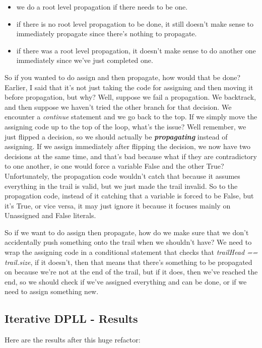 \documentclass[../main.tex]{subfiles}
\begin{document}
\begin{itemize}
    \item we do a root level propagation if there needs to be one.
    \item if there is no root level propagation to be done, it still
            doesn't make sense to immediately propagate since there's 
            nothing to propagate.
    \item if there was a root level propagation, it doesn't make sense 
            to do another one immediately since we've just completed one.
\end{itemize}

So if you wanted to do assign and then propagate, how would that be done? 
Earlier, I said that it's not just taking the code for assigning and then 
moving it before propagation, but why? Well, suppose we fail a propagation. 
We backtrack, and then suppose we haven't tried the other branch for that 
decision. We encounter a \textit{continue} statement and we go back to the 
top. If we simply move the assigning code up to the top of the loop,
what's the issue? Well remember, we just flipped a decision, so we should
actually be \textbf{\textit{propagating}} instead of assigning. If we 
assign immediately after flipping the decision, we now have two decisions 
at the same time, and that's bad because what if they are contradictory to 
one another, ie one would force a variable False and the other True? 
Unfortunately, the propagation code wouldn't catch that because it assumes 
everything in the trail is valid, but we just made the trail invalid. So 
to the propagation code, instead of it catching that a variable is forced to be 
False, but it's True, or vice versa, it may just ignore it because it focuses 
mainly on Unassigned and False literals.

So if we want to do assign then propagate, how do we make sure that 
we don't accidentally push something onto the trail when we shouldn't have?
We need to wrap the assigning code in a conditional statement that checks that 
\textit{trailHead == trail.size}, if it doesn't, then that means that there's 
something to be propagated on because we're not at the end of the trail, but 
if it does, then we've reached the end, so we should check if we've assigned 
everything and can be done, or if we need to assign something new.

\subsection{Iterative DPLL - Results}
Here are the results after this huge refactor:
\end{document}
